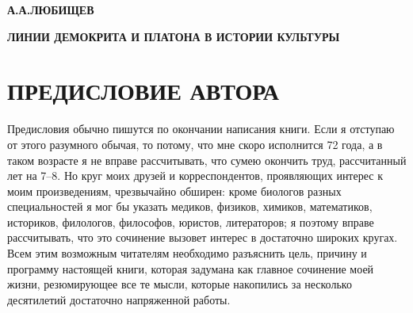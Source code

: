 
\begin{center}
  \textbf{А.А.ЛЮБИЩЕВ}
\end{center}


\begin{center}
  \textbf{ЛИНИИ ДЕМОКРИТА И ПЛАТОНА В ИСТОРИИ КУЛЬТУРЫ}
\end{center}

\clearpage{}

\tableofcontents{}

\clearpage{}

\section{ПРЕДИСЛОВИЕ АВТОРА}

Предисловия  обычно  пишутся  по  окончании написания  книги.  Если  я
отступаю  от  этого  разумного  обычая,   то  потому,  что  мне  скоро
исполнится  72 года,  а в  таком  возрасте я  не вправе  рассчитывать,
что  сумею окончить  труд,  рассчитанный  лет на  7--8.  Но круг  моих
друзей и  корреспондентов, проявляющих  интерес к  моим произведениям,
чрезвычайно  обширен: кроме  биологов разных  специальностей я  мог бы
указать медиков, физиков,  химиков, математиков, историков, филологов,
философов, юристов,  литераторов; я  поэтому вправе  рассчитывать, что
это сочинение вызовет  интерес в достаточно широких  кругах. Всем этим
возможным читателям  необходимо разъяснить  цель, причину  и программу
настоящей книги,  которая задумана  как главное сочинение  моей жизни,
резюмирующее все те мысли, которые накопились за несколько десятилетий
достаточно напряженной работы.

